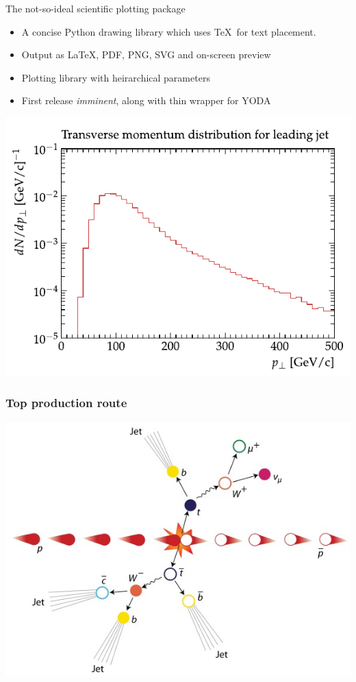 \documentclass{beamer}
\begin{document}
  \begin{frame}{The not-so-ideal scientific plotting package}
    
    \begin{itemize}[<uncover@+>]
      \item A concise Python drawing library which uses \TeX\ for text placement.
      \item Output as \LaTeX, PDF, PNG, SVG and on-screen preview
      \item Plotting library with heirarchical parameters
      \item First release {\em imminent}, along with thin wrapper for YODA
    \end{itemize}
  \end{frame}
  \begin{frame}
    \includegraphics[width=\textwidth]{daveplot}
  \end{frame}

  \begin{frame}
    \frametitle{Top production route}
    \includegraphics[height=0.89\textheight]{ttbar.jpg}
  \end{frame}
\end{document}
